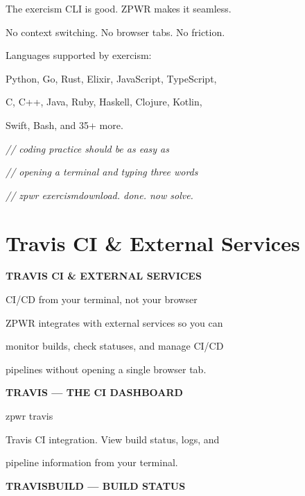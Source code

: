 \documentclass[11pt,a4paper,twoside]{book}
\begin{document}
The exercism CLI is good. ZPWR makes it seamless.

No context switching. No browser tabs. No friction.

Languages supported by exercism:

Python, Go, Rust, Elixir, JavaScript, TypeScript,

C, C++, Java, Ruby, Haskell, Clojure, Kotlin,

Swift, Bash, and 35+ more.

{\small\itshape\color{dimtext} // coding practice should be as easy as}

{\small\itshape\color{dimtext} // opening a terminal and typing three words}

{\small\itshape\color{dimtext} // zpwr exercismdownload. done. now solve.}


\vspace{16pt}

\section{Travis CI \& External Services}


\vspace{10pt}
{\large\bfseries\color{neoncyan} TRAVIS CI \& EXTERNAL SERVICES}\vspace{6pt}

CI/CD from your terminal, not your browser

ZPWR integrates with external services so you can

monitor builds, check statuses, and manage CI/CD

\begin{codebox}
pipelines without opening a single browser tab.\\
\end{codebox}


\vspace{12pt}
{\bfseries\color{neonyellow} TRAVIS — THE CI DASHBOARD}\vspace{4pt}

\begin{codebox}
zpwr travis\\
\end{codebox}

Travis CI integration. View build status, logs, and

pipeline information from your terminal.


\vspace{12pt}
{\bfseries\color{neonyellow} TRAVISBUILD — BUILD STATUS}\vspace{4pt}
\end{document}
